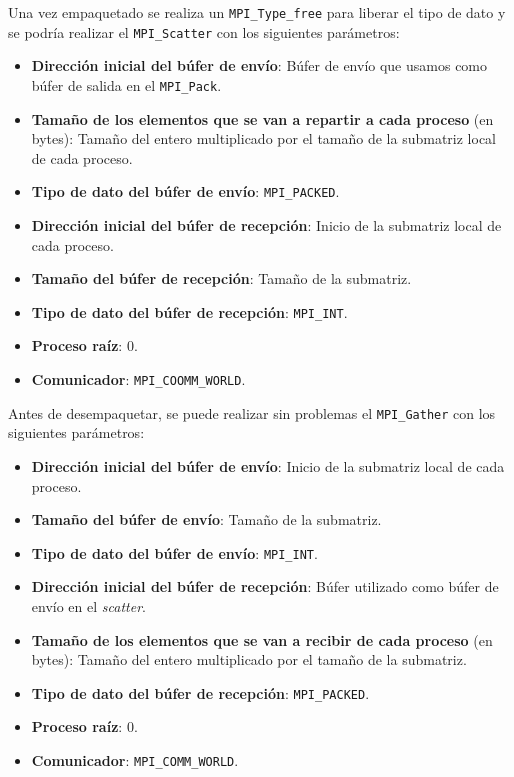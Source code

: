 Una vez empaquetado se realiza un \texttt{MPI\_Type\_free} para liberar el tipo de dato y se podría realizar el \texttt{MPI\_Scatter} con los siguientes parámetros:
\begin{itemize}
	\item \textbf{Dirección inicial del búfer de envío}: Búfer de envío que usamos como búfer de salida en el  \texttt{MPI\_Pack}.
	\item \textbf{Tamaño de los elementos que se van a repartir a cada proceso} (en bytes): Tamaño del entero multiplicado por el tamaño de la submatriz local de cada proceso.
	\item \textbf{Tipo de dato del búfer de envío}: \texttt{MPI\_PACKED}.
	\item \textbf{Dirección inicial del búfer de recepción}: Inicio de la submatriz local de cada proceso.
	\item \textbf{Tamaño del búfer de recepción}: Tamaño de la submatriz.
	\item \textbf{Tipo de dato del búfer de recepción}: \texttt{MPI\_INT}.
	\item \textbf{Proceso raíz}: 0.
	\item \textbf{Comunicador}: \texttt{MPI\_COOMM\_WORLD}.
\end{itemize}

Antes de desempaquetar, se puede realizar sin problemas el \texttt{MPI\_Gather} con los siguientes parámetros:
\begin{itemize}
	\item \textbf{Dirección inicial del búfer de envío}: Inicio de la submatriz local de cada proceso.
	\item \textbf{Tamaño del búfer de envío}: Tamaño de la submatriz.
	\item \textbf{Tipo de dato del búfer de envío}: \texttt{MPI\_INT}.
	\item \textbf{Dirección inicial del búfer de recepción}: Búfer utilizado como búfer de envío en el \textit{scatter}.
	\item \textbf{Tamaño de los elementos que se van a recibir de cada proceso} (en bytes): Tamaño del entero multiplicado por el tamaño de la submatriz.
	\item \textbf{Tipo de dato del búfer de recepción}: \texttt{MPI\_PACKED}.
	\item \textbf{Proceso raíz}: 0.
	\item \textbf{Comunicador}: \texttt{MPI\_COMM\_WORLD}.
\end{itemize}

